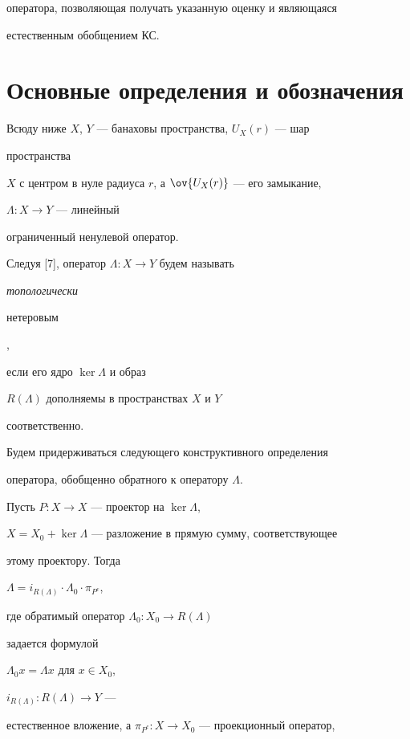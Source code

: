 оператора, позволяющая получать указанную оценку и являющаяся 


естественным обобщением КС. 


 


\section{Основные определения и обозначения} 


 


Всюду ниже $X$, $Y$ --- банаховы пространства, $U_X(r)$ --- шар 


пространства 


$X$ с центром в нуле радиуса $r$, а $\ov{U_X(r)}$ --- его замыкание, 


$\Lambda:X\to Y$ --- линейный  


ограниченный ненулевой оператор. 


 


Следуя [7], оператор $\Lambda:X\to Y$ будем называть {\it топологически 


нетеровым}, 


если его ядро $\ker\Lambda$ и образ 


$R(\Lambda)$ дополняемы в пространствах $X$ и $Y$ 


соответственно. 


 


Будем придерживаться следующего конструктивного определения  


оператора, обобщенно обратного к оператору $\Lambda$. 


 


Пусть $P:X\to X$ --- проектор на $\ker\Lambda$, 


$X=X_0+\ker\Lambda$ --- разложение в прямую сумму, соответствующее 


этому проектору. Тогда 


$\Lambda=i_{R(\Lambda)}\cdot\Lambda_0\cdot\pi_{P^c}$, 


где обратимый оператор $\Lambda_0:X_0\to R(\Lambda)$ 


задается формулой 


$\Lambda_0x=\Lambda x$ для $x\in X_0$, 


$i_{R(\Lambda)}:R(\Lambda)\to Y$ --- 


естественное вложение, а $\pi_{P^c}:X\to X_0$ --- проекционный оператор, 


